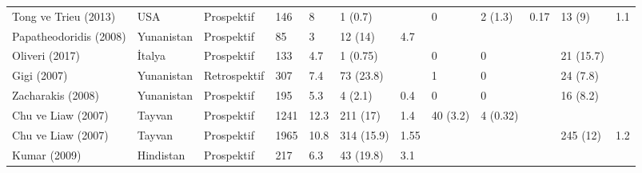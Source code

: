 \begin{table}
\begin{minipage}[c]{\textwidth}
\begin{threeparttable}
{\begin{tabular}{llllL{1cm}L{1.4cm}L{1.4cm}llL{1cm}L{1.7cm}L{1.7cm}}
Tong ve Trieu (2013) \cite{tong2013hepatitis}  \:    & USA           & Prospektif      & 146        & 8                  & 1 (0.7)                &                          & 0                & 2 (1.3)            & 0.17                   & 13 (9)                    & 1.1            \\
Papatheodoridis (2008) \cite{papatheodoridis2008longitudinal}  \:   & Yunanistan    & Prospektif      & 85         & 3                  & 12 (14)                & 4.7                      &                  &                    &                        &                           &                              \\
Oliveri (2017)  \cite{oliveri2017long}    \:      & İtalya        & Prospektif      & 133        & 4.7                & 1 (0.75)               &                          & 0                & 0                  &                        & 21 (15.7)                 &                              \\
Gigi (2007) \cite{gigi2007long}     \:          & Yunanistan    & Retrospektif    & 307        & 7.4                & 73 (23.8)              &                          & 1                & 0                  &                        & 24 (7.8)                  &                              \\
Zacharakis (2008) \cite{zacharakis2008role}  \:      & Yunanistan    & Prospektif      & 195        & 5.3                & 4 (2.1)                & 0.4                      & 0                & 0                  &                        & 16 (8.2)                  &                              \\
Chu ve Liaw (2007) \cite{chu2007spontaneous}   \:     & Tayvan        & Prospektif      & 1241       & 12.3               & 211 (17)               & 1.4                      & 40 (3.2)         & 4 (0.32)         &                        &                           &                              \\
Chu ve Liaw (2007) \cite{chu2007hbsag}   \:     & Tayvan        & Prospektif      & 1965       & 10.8               & 314 (15.9)             & 1.55                     &                  &                    &                        & 245 (12)                  & 1.2           \\
Kumar (2009)  \cite{kumar2009spontaneous}    \:        & Hindistan     & Prospektif      & 217        & 6.3                & 43 (19.8)              & 3.1                      &                  &                    &                        &                           &                              \\

\end{tabular}}
\end{threeparttable}
\end{minipage}
\end{table}

